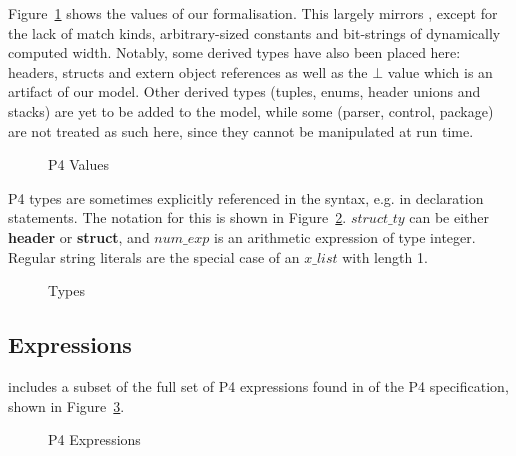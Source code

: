 \documentclass[UTF8]{article}
\begin{document}
Figure~\ref{fig:val} shows the values of our formalisation. This largely mirrors , except for the lack of match kinds, arbitrary-sized constants and bit-strings of dynamically computed width. Notably, some derived types have also been placed here: headers, structs and extern object references as well as the $\bot$ value which is an artifact of our model. Other derived types (tuples, enums, header unions and stacks) are yet to be added to the model, while some (parser, control, package) are not treated as such here, since they cannot be manipulated at run time.

\begin{figure}[h!]
\centering\ottgrammartabular{
\ottv\ottafterlastrule
}
\caption{P4 Values}
\label{fig:val}
\end{figure}

P4 types are sometimes explicitly referenced in the syntax, e.g. in declaration statements. The notation for this is shown in Figure~\ref{fig:types}. $\mathit{struct\_ty}$ can be either \textbf{header} or \textbf{struct}, and $\mathit{num\_exp}$ is an arithmetic expression of type integer. Regular string literals are the special case of an $\mathit{x\_list}$ with length 1.

\begin{figure}[h!]
\centering\ottgrammartabular{
\otttau\ottafterlastrule
}
\caption{Types}
\label{fig:types}
\end{figure}

\newcommand{\funn}{\ensuremath{\mathit{funn}}}
\newcommand{\stmt}{\textit{stmt}}
\newcommand{\cval}{\ensuremath{v}}
\newcommand{\fexec}[1]{\textbf{exec}\,\,#1}
\newcommand{\avn}{\ensuremath{\mathit{varn}}}
\newcommand{\fmap}{\textit{F}}
\subsection{Expressions}

\pfott{} includes a subset of the full set of P4 expressions found in {} of the P4 specification, shown in Figure~\ref{fig:exp}.

\begin{figure}[h!]
\centering\ottgrammartabular{
\otte\ottafterlastrule
}
\caption{P4 Expressions}
\label{fig:exp}
\end{figure}
\end{document}
